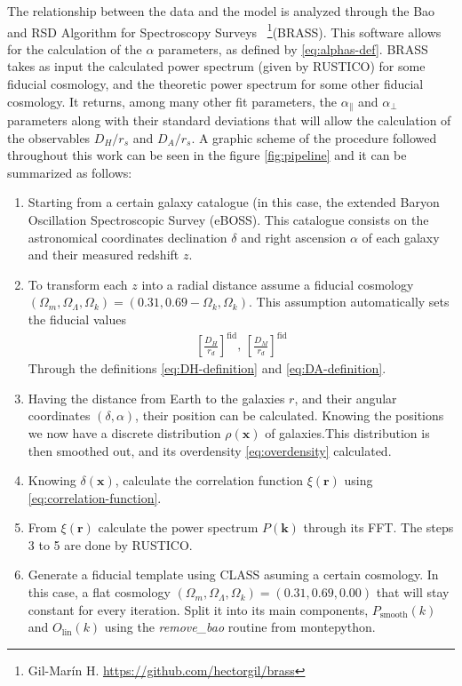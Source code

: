 The relationship between the data and the model is analyzed through the Bao and RSD Algorithm for Spectroscopy Surveys ~\footnote{Gil-Marín H. \url{https://github.com/hectorgil/brass}}(BRASS). This software allows for the calculation of the $\alpha$ parameters, as defined by \eqref{eq:alphas-def}. BRASS takes as input the calculated power spectrum (given by RUSTICO) for some  fiducial cosmology, and the theoretic power spectrum for some other fiducial cosmology. It returns, among many other fit parameters, the $\alpha_\parallel$ and $\alpha_\perp$ parameters along with their standard deviations that will allow the calculation of the observables $D_H/r_s$ and $D_A /r_s$. A graphic scheme of the procedure followed throughout this work can be seen in the figure \ref{fig:pipeline} and it can be summarized as follows:
\begin{enumerate}
	\item Starting from a certain galaxy catalogue (in this case, the extended Baryon Oscillation Spectroscopic Survey (eBOSS). This catalogue consists on the astronomical coordinates declination $\delta$ and right ascension $\alpha$ of each galaxy and their measured redshift $z$.
	\item To transform each $z$ into a radial distance assume a fiducial cosmology $(\Omega_m, \Omega_\Lambda, \Omega_k) = (0.31, 0.69-\Omega_k, \Omega_k) $. This assumption automatically sets the fiducial values 
	\begin{align}
		\left[ \frac{D_H}{r_d} \right] ^\text{fid}, \,\left[ \frac{D_M}{r_d} \right] ^\text{fid}
	\end{align}
	Through the definitions \eqref{eq:DH-definition} and \eqref{eq:DA-definition}.
\item Having the distance from Earth to the galaxies $r$, and their angular coordinates $(\delta, \alpha)$, their position can be calculated. Knowing the positions we now have a discrete distribution $\rho(\textbf{x})$ of galaxies.This distribution is then smoothed out, and its overdensity \eqref{eq:overdensity} calculated.
\item Knowing $\delta(\textbf{x})$, calculate the correlation function $\xi(\textbf{r})$ using \eqref{eq:correlation-function}.
\item From $\xi(\textbf{r})$ calculate the power spectrum $P(\textbf{k})$ through its FFT. The steps 3 to 5 are done by RUSTICO.
\item Generate a fiducial template using CLASS asuming a certain cosmology. In this case, a flat cosmology $(\Omega_m, \Omega_\Lambda, \Omega_k) = (0.31, 0.69, 0.00)$ that will stay constant for every iteration. Split it into its main components,  $P_{\text{smooth}}(k)$ and $O_{\text{lin}}(k)$ using the \textit{remove\_bao} routine from montepython.

\end{enumerate}
